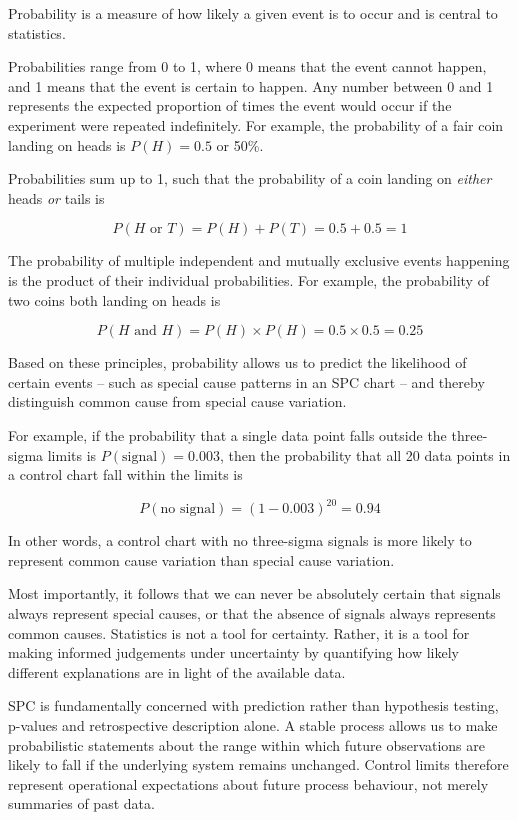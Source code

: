 \documentclass[
]{book}
\begin{document}
Probability is a measure of how likely a given event is to occur and is
central to statistics.

Probabilities range from 0 to 1, where 0 means that the event cannot
happen, and 1 means that the event is certain to happen. Any number
between 0 and 1 represents the expected proportion of times the event
would occur if the experiment were repeated indefinitely. For example,
the probability of a fair coin landing on heads is \(P(H) = 0.5\) or
50\%.

Probabilities sum up to 1, such that the probability of a coin landing
on \emph{either} heads \emph{or} tails is

\[P(H \text{ or } T) = P(H) + P(T) = 0.5 + 0.5 = 1\]

The probability of multiple independent and mutually exclusive events
happening is the product of their individual probabilities. For example,
the probability of two coins both landing on heads is

\[P(H \text{ and } H) = P(H) \times P(H) = 0.5 \times 0.5 = 0.25\]

Based on these principles, probability allows us to predict the
likelihood of certain events -- such as special cause patterns in an SPC
chart -- and thereby distinguish common cause from special cause
variation.

For example, if the probability that a single data point falls outside
the three-sigma limits is \(P(\text{signal}) = 0.003\), then the
probability that all 20 data points in a control chart fall within the
limits is

\[P(\text{no signal}) = (1-0.003)^{20} = 0.94\]

In other words, a control chart with no three-sigma signals is more
likely to represent common cause variation than special cause variation.

Most importantly, it follows that we can never be absolutely certain
that signals always represent special causes, or that the absence of
signals always represents common causes. Statistics is not a tool for
certainty. Rather, it is a tool for making informed judgements under
uncertainty by quantifying how likely different explanations are in
light of the available data.

SPC is fundamentally concerned with prediction rather than hypothesis
testing, p-values and retrospective description alone. A stable process
allows us to make probabilistic statements about the range within which
future observations are likely to fall if the underlying system remains
unchanged. Control limits therefore represent operational expectations
about future process behaviour, not merely summaries of past data.
\end{document}
